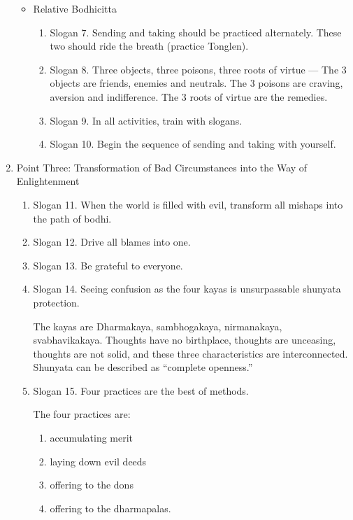 \begin{enumerate}
\begin{itemize}
        \item Relative Bodhicitta
        \begin{enumerate}
          \item Slogan 7. Sending and taking should be practiced alternately. These two should ride the breath (practice Tonglen).
          \item Slogan 8. Three objects, three poisons, three roots of virtue --- The 3 objects are friends, enemies and neutrals. The 3 poisons are craving, aversion and indifference. The 3 roots of virtue are the remedies.
          \item Slogan 9. In all activities, train with slogans.
          \item Slogan 10. Begin the sequence of sending and taking with yourself.
        \end{enumerate}
      \end{itemize}

    \item Point Three: Transformation of Bad Circumstances into the Way of Enlightenment

    \begin{enumerate}
        \item Slogan 11. When the world is filled with evil, transform all mishaps into the path of bodhi.
        \item Slogan 12. Drive all blames into one.
        \item Slogan 13. Be grateful to everyone.
        \item Slogan 14. Seeing confusion as the four kayas is unsurpassable shunyata protection.

            The kayas are Dharmakaya, sambhogakaya, nirmanakaya, svabhavikakaya.
Thoughts have no birthplace, thoughts are unceasing, thoughts are not solid, and
these three characteristics are interconnected. Shunyata can be described as
``complete openness.''

        \item Slogan 15. Four practices are the best of methods.

            The four practices are: 
              \begin{enumerate}
                \item accumulating merit
                \item laying down evil deeds
                \item offering to the dons
                \item offering to the dharmapalas.
              \end{enumerate}


\end{enumerate}
\end{enumerate}

